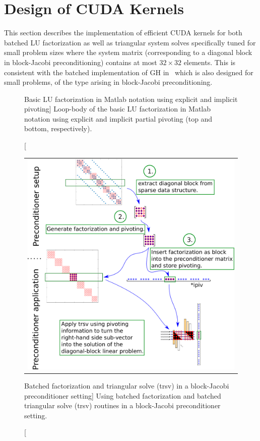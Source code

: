  \section{Design of CUDA Kernels}
 \label{2017-lu-block-jacobi:sec:kernel}

This section describes the implementation
of efficient CUDA kernels for both batched LU factorization
as well as triangular system solves
specifically tuned for small problem sizes
where the system matrix (corresponding to a diagonal block in block-Jacobi preconditioning) 
contains at most $32 \times 32$ elements.
This is consistent with the batched implementation of GH in~\cite{gh}
which is also designed for small problems, of the type arising in block-Jacobi preconditioning.

\begin{figure}[t]
\begin{center}
\begin{minipage}{0.9\columnwidth}
{\small

}
\end{minipage}
\begin{minipage}{0.9\columnwidth}
{\small

}
\end{minipage}
\caption
[Basic LU factorization in Matlab notation using explicit and implicit pivoting]
{Loop-body of the basic LU factorization in Matlab notation
    using explicit and implicit partial pivoting (top and bottom, respectively).}
\label{2017-lu-block-jacobi:fig:lu}
\end{center}
\end{figure}

\begin{figure}[t]
\begin{center}
\begin{tabular}{c}
\includegraphics[width=.6\columnwidth]{plots/fact_based_blockJacobi}
\end{tabular}
\end{center}
\caption
[Batched factorization and triangular solve ({\sc trsv}) 
in a block-Jacobi preconditioner setting]
{Using batched factorization and batched triangular solve ({\sc trsv}) 
         routines in a block-Jacobi preconditioner setting.%
}
\label{2017-lu-block-jacobi:fig:precscheme}
\end{figure}

